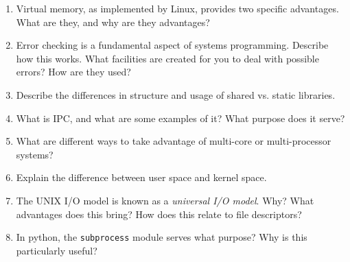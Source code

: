 \documentclass[letterpaper,10pt,onecolumn,titlepage]{article}
\begin{document}
\begin{enumerate}[itemsep=0.1 in]
\item Virtual memory, as implemented by Linux, provides two specific advantages. What are
  they, and why are they advantages?

\item Error checking is a fundamental aspect of systems programming. Describe how this
  works. What facilities are created for you to deal with possible errors? How are they
  used?

\item Describe the differences in structure and usage of shared vs. static libraries.

\item What is IPC, and what are some examples of it? What purpose does it serve?

\item What are different ways to take advantage of multi-core or multi-processor systems?

\item Explain the difference between user space and kernel space.

\item The UNIX I/O model is known as a \emph{universal I/O model}. Why? What advantages
  does this bring? How does this relate to file descriptors?

\item\label{last} In python, the \texttt{subprocess} module serves what purpose? Why is
  this particularly useful?


\end{enumerate}

\end{document}
